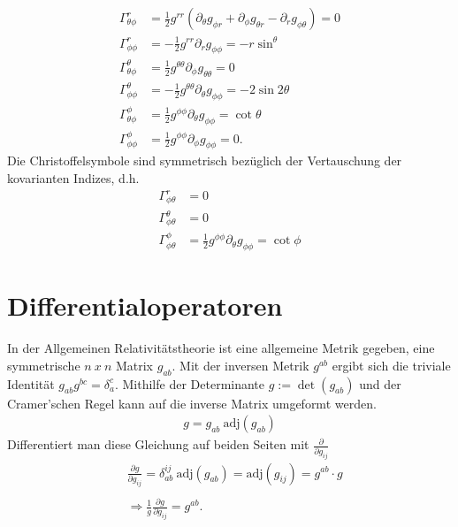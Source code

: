 \documentclass[a4paper]{article}
\begin{document}
\begin{align}
\Gamma^{r}_{\theta\phi}&=\frac{1}{2}g^{rr}(\partial_\theta g_{\phi r}
+\partial_\phi g_{\theta r} - \partial_r g_{\phi\theta}) = 0\\
    \Gamma^{r}_{\phi\phi} &=-\frac{1}{2}g^{rr}\partial_r g_{\phi\phi}=
    -r\sin^\theta\\
    \Gamma^{\theta}_{\theta\phi} &= \frac{1}{2}g^{\theta\theta}\partial_\phi
    g_{\theta\theta} = 0\\
    \Gamma^{\theta}_{\phi\phi} &= -\frac{1}{2}g^{\theta\theta}\partial_\theta
    g_{\phi\phi} = -2\sin2\theta\\
    \Gamma^{\phi}_{\theta\phi} &= \frac{1}{2}g^{\phi\phi}\partial_\theta
    g_{\phi\phi} = \cot\theta\\
    \Gamma^{\phi}_{\phi\phi} &= \frac{1}{2}g^{\phi\phi}\partial_\phi
    g_{\phi\phi} = 0.
\end{align}
Die Christoffelsymbole sind symmetrisch bezüglich der Vertauschung der
kovarianten Indizes, d.h.
\begin{align}
    \Gamma^r_{\phi\theta} &= 0\\
    \Gamma^\theta_{\phi\theta} &= 0 \\
    \Gamma^\phi_{\phi\theta} & = \frac{1}{2} g^{\phi\phi} \partial_\theta
    g_{\phi\phi} = \cot\phi
\end{align}
\section{Differentialoperatoren}
In der Allgemeinen Relativitätstheorie ist eine allgemeine Metrik gegeben,
eine symmetrische $n\ x\ n$ Matrix $g_{ab}$. Mit der inversen Metrik $g^{ab}$
ergibt sich die triviale Identität $g_{ab}g^{bc} = \delta ^c_a$. Mithilfe der
Determinante $g := \det(g_{ab})$ und der Cramer'schen Regel
kann auf die inverse Matrix umgeformt
werden.
\begin{align}
    g = g_{ab}\ \text{adj}(g_{ab})
\end{align}
Differentiert man diese Gleichung auf beiden Seiten mit
$\frac{\partial}{\partial g_{ij}}$
\begin{align}
    &\frac{\partial g }{\partial g_{ij}} = \delta_{ab}^{ij}\
    \text{adj}(g_{ab}) = \text{adj}(g_{ij}) = g^{ab} \cdot g \\
    \nonumber \\
    &\Rightarrow \frac{1}{g} \frac{\partial g}{\partial g_{ij}} =
    g^{ab}.
\end{align}
\end{document}
